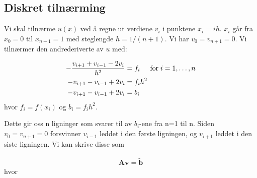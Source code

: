 \documentclass[reprint,english,notitlepage]{revtex4-1}
\begin{document}
\subsection{Diskret tilnærming}

	Vi skal tilnærme $u(x)$ ved å regne ut verdiene $v_i$ i punktene $x_i = ih$. $x_i$ går fra $x_0 = 0$ til $x_{n+1} = 1$ med steglengde $h=1/(n+1)$. Vi har $v_0 = v_{n+1} = 0$. Vi tilnærmer den andrederiverte av $u$ med:
	
	\begin{equation*}
	\begin{aligned}
	-\frac{v_{i+1}+v_{i-1}-2v_i}{h^2} &= f_i  \hspace{0.5cm} \mathrm{for} \hspace{0.1cm} i=1,\dots, n \\
	-v_{i+1} - v_{i-1} + 2v_i &= f_i h^2 \\
	-v_{i+1} - v_{i-1} + 2v_i &= b_i
	\end{aligned}
	\end{equation*}
	hvor $f_i=f(x_i)$ og $b_i = f_i h^2$.
	
	Dette gir oss n ligninger som svarer til av $b_i$-ene fra n=1 til n. Siden $v_0 = v_{n+1} = 0$ forsvinner $v_{i-1}$ leddet i den første ligningen, og $v_{i+1}$ leddet i den siste ligningen. Vi kan skrive disse som
	
	\begin{equation*}
	\begin{aligned}
	\mathbf{A}\mathbf{v} = \tilde{\mathbf{b}}
	\end{aligned}
	\end{equation*}
	hvor
\end{document}
